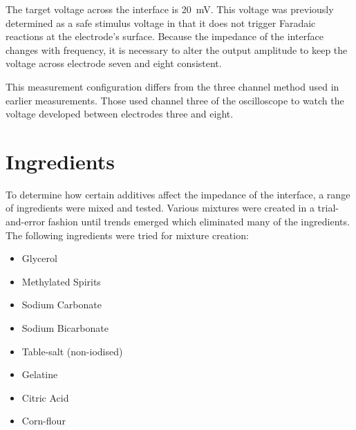   The target voltage across the interface is \SI{20}{\milli\volt}.
  This voltage was previously determined as a safe stimulus voltage in that it does not trigger Faradaic reactions at the electrode's surface.
  Because the impedance of the interface changes with frequency, it is necessary to alter the output amplitude to keep the voltage across electrode seven and eight consistent.
  
  This measurement configuration differs from the three channel method used in earlier measurements.
  Those used channel three of the oscilloscope to watch the voltage developed between electrodes three and eight.
  

\section{Ingredients}


  To determine how certain additives affect the impedance of the interface, a range of ingredients were mixed and tested.
  Various mixtures were created in a trial-and-error fashion until trends emerged which eliminated many of the ingredients.
  The following ingredients were tried for mixture creation:
  \begin{itemize}
      \item Glycerol
      \item Methylated Spirits
      \item Sodium Carbonate
      \item Sodium Bicarbonate
      \item Table-salt (non-iodised)
      \item Gelatine
      \item Citric Acid
      \item Corn-flour
  \end{itemize}




